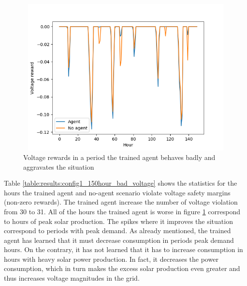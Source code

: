 \documentclass[class=book, crop=false]{standalone}
\begin{document}
\begin{figure}[H]
    \center
\includegraphics[height=8cm, width=12cm]{figures/config1_150hour_bad_voltage.png}
    \caption[size = 9]{Voltage rewards in a period the trained agent behaves badly and aggravates the situation}
    \label{fig:results:config1_150hour_bad_voltage}
\end{figure}
Table \ref{table:results:config1_150hour_bad_voltage} shows the statistics for the hours the trained agent and no-agent scenario violate voltage safety margins (non-zero rewards). The trained agent increase the number of voltage violation from 30 to 31. All of the hours the trained agent is worse in figure \ref{fig:results:config1_150hour_bad_voltage} correspond to hours of peak solar production. The spikes where it improves the situation correspond to periods with peak demand. As already mentioned, the trained agent has learned that it must decrease consumption in periods peak demand hours. On the contrary, it has not learned that it has to increase consumption in hours with heavy solar power production. In fact, it decreases the power consumption, which in turn makes the excess solar production even greater and thus increases voltage magnitudes in the grid.  
\end{document}
